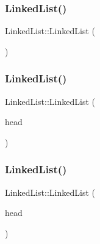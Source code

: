 \subsubsection{\texorpdfstring{Linked\+List()}{LinkedList()}\hspace{0.1cm}{\footnotesize\ttfamily [1/3]}}
{\footnotesize\ttfamily Linked\+List\+::\+Linked\+List (\begin{DoxyParamCaption}{ }\end{DoxyParamCaption})}

\mbox{\label{class_linked_list_ae4a0a3646caae0f7eedb6bd6d6744dbb}} 
\subsubsection{\texorpdfstring{Linked\+List()}{LinkedList()}\hspace{0.1cm}{\footnotesize\ttfamily [2/3]}}
{\footnotesize\ttfamily Linked\+List\+::\+Linked\+List (\begin{DoxyParamCaption}\item[{\hyperlink{class_node}{Node} $\ast$}]{head }\end{DoxyParamCaption})}

\mbox{\label{class_linked_list_a5dd2a88ad50e83aee19dea51c8d87d90}} 
\subsubsection{\texorpdfstring{Linked\+List()}{LinkedList()}\hspace{0.1cm}{\footnotesize\ttfamily [3/3]}}
{\footnotesize\ttfamily Linked\+List\+::\+Linked\+List (\begin{DoxyParamCaption}\item[{const \hyperlink{class_linked_list}{Linked\+List} \&}]{head }\end{DoxyParamCaption})}

